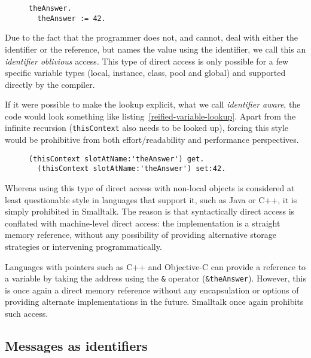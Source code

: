 \documentclass[preprint,authoryear]{acm_proc_article-sp}
\begin{document}
\begin{figure}[htbp]
\begin{lstlisting}[style=L,label=variable-lookup,caption=Interacting with a local resource.]
  theAnswer.
  theAnswer := 42.
\end{lstlisting}
\end{figure}

Due to the fact that the programmer does not, and cannot, deal with either the identifier
or the reference, but names the value using the identifier, we call this an {\em identifier oblivious}
access.  This type of direct access is only possible for a few specific variable types
(local, instance, class, pool and global) and supported directly by the compiler.

If it were possible to make the lookup explicit, what we call {\em identifier aware},
the code would look something like listing~\ref{reified-variable-lookup}.  Apart
from the infinite recursion ({\tt thisContext}  also needs to be looked up),
forcing this style would be prohibitive from both effort/readability and performance
perspectives.


\begin{figure}[htbp]
\begin{lstlisting}[style=L,label=reified-variable-lookup,caption=Reified local resource access.]
  (thisContext slotAtName:'theAnswer') get.
  (thisContext slotAtName:'theAnswer') set:42.
\end{lstlisting}
\end{figure}

Whereas using this type of direct access with non-local objects is considered at least
questionable style in languages that support it, such as Java or C++, it is simply prohibited in Smalltalk.
The reason is that syntactically direct access is conflated with machine-level direct
access:  the implementation is a straight memory reference, without any possibility
of providing alternative storage strategies or intervening programmatically.

Languages with pointers such as C++ and Objective-C can provide a reference to a variable
by taking the address using the {\tt \&} operator ({\tt \&theAnswer}).   However, this is once
again a direct memory reference without any encapsulation or options of providing 
alternate implementations in the future.  Smalltalk once again prohibits such access.

\subsection{Messages as identifiers}
\end{document}
